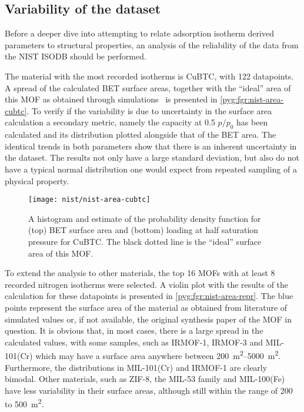 \subsection{Variability of the dataset}

Before a deeper dive into attempting to relate adsorption isotherm
derived parameters to structural properties, an analysis of the 
reliability of the data from the NIST ISODB should be performed.

The material with the most recorded isotherms is CuBTC, with 
122 datapoints. A spread of the calculated BET surface areas,
together with the ``ideal'' area of this MOF as obtained
through simulations~\cite{parkHowReproducibleAre2017} is 
presented in \autoref{pyg:fgr:nist-area-cubtc}.
To verify if the variability is due to uncertainty in the 
surface area calculation a secondary metric, namely the 
capacity at 0.5 \(p/p_0\) has been calculated and its 
distribution plotted alongside that of the BET area. The
identical trends in both parameters show that there is an
inherent uncertainty in the dataset. The results not only 
have a large standard deviation, but also do not have a 
typical normal distribution one would expect from repeated
sampling of a physical property.

\begin{wrapfigure}{h}{0.5\textwidth}
    \centering
    \captionsetup{format=plain}
    \texttt{[image: nist/nist-area-cubtc]}%
    \caption{A histogram and estimate of the probability density 
    function for (top) BET surface area and (bottom) loading
    at half saturation pressure for CuBTC. The black dotted line
    is the ``ideal'' surface area of this MOF.}%
    \label{pyg:fgr:nist-area-cubtc}
\end{wrapfigure}

To extend the analysis to other materials, the top 16 MOFs with 
at least 8 recorded nitrogen isotherms were selected. A 
violin plot with the results of the calculation for 
these datapoints is presented in \autoref{pyg:fgr:nist-area-repr}.
The blue points represent the surface area of the material as
obtained from literature of simulated values or, if not available,
the original synthesis paper of the MOF in question.
It is obvious that, in most cases, there is a large spread in
the calculated values, with some samples, such as IRMOF-1,
IRMOF-3 and MIL-101(Cr) which may have a surface area anywhere
between \SIrange{200}{5000}{\metre^2}. Furthermore, the
distributions in MIL-101(Cr) and IRMOF-1 are clearly 
bimodal. Other materials, such as ZIF-8, the MIL-53 family
and MIL-100(Fe) have less variability in their surface areas,
although still within the range of 200 to \SI{500}{\metre^2}.

